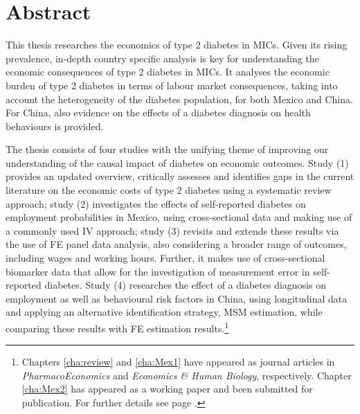 \cleardoublepage
{}
\chapter*{\label{abstract}Abstract}
This thesis researches the economics of type 2 diabetes in \acfp{MIC}. Given its rising prevalence, in-depth country specific analysis is key for understanding the economic consequences of type 2 diabetes in \acp{MIC}. It analyses the economic burden of type 2 diabetes in terms of labour market consequences, taking into account the heterogeneity of the diabetes population, for both Mexico and China. For China, also evidence on the effects of a diabetes diagnosis on health behaviours is provided.

The thesis consists of four studies with the unifying theme of improving our understanding of the causal impact of diabetes on  economic outcomes. Study (1) provides an updated overview, critically assesses and identifies gaps in the current literature on the economic costs of type 2 diabetes using a systematic review approach; study (2) investigates the effects of self-reported diabetes on employment probabilities in Mexico, using cross-sectional data and making use of a commonly used \acf{IV} approach; study (3) revisits and extends these results via the use of \ac{FE} panel data analysis, also considering a broader range of outcomes, including wages and working hours. Further, it makes use of cross-sectional biomarker data that allow for the investigation of measurement error in self-reported diabetes. Study (4) researches the effect of a diabetes diagnosis on employment as well as behavioural risk factors in China, using longitudinal data and applying an alternative identification strategy, \acf{MSM} estimation, while comparing these results with \ac{FE} estimation results.\footnote{Chapters \ref{cha:review} and \ref{cha:Mex1} have appeared as journal articles in \textit{PharmacoEconomics} and \textit{Economics \& Human Biology}, respectively. Chapter \ref{cha:Mex2} has appeared as a working paper and been submitted for publication. For further details see page \pageref{publication_statement}.}

